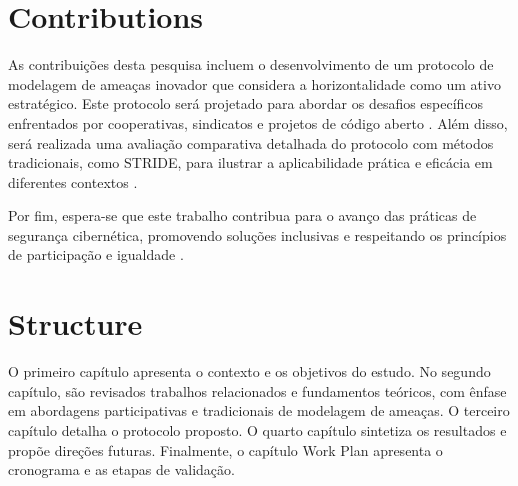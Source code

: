 \section{Contributions}
\label{sec:contributions}

As contribuições desta pesquisa incluem o desenvolvimento de um
protocolo de modelagem de ameaças inovador que considera a
horizontalidade como um ativo estratégico. Este protocolo será
projetado para abordar os desafios específicos enfrentados por
cooperativas, sindicatos e projetos de código aberto
\cite{ThreatModelingASystematicLiteratureReview, CoReTM,
ParticipatoryThreatModelling}. Além disso, será realizada uma
avaliação comparativa detalhada do protocolo com métodos tradicionais,
como STRIDE, para ilustrar a aplicabilidade prática e eficácia em
diferentes contextos \cite{AHybridThreatModelingMethod,
EvaluationofCompetingThreatModeling,
ExperiencesThreatModelingAtMicrosoft,
ThreatModelingASummaryOfAvailableMethods}.

Por fim, espera-se que este trabalho contribua para o avanço das
práticas de segurança cibernética, promovendo soluções inclusivas e
respeitando os princípios de participação e igualdade \cite{Colbac,
AbcCrypto}.

\section{Structure}
\label{sec:structure}

O primeiro capítulo apresenta o contexto e os objetivos do estudo. No
segundo capítulo, são revisados trabalhos relacionados e fundamentos
teóricos, com ênfase em abordagens participativas e tradicionais de
modelagem de ameaças. O terceiro capítulo detalha o protocolo
proposto. O quarto capítulo sintetiza os resultados e propõe direções
futuras. Finalmente, o capítulo Work Plan apresenta o cronograma e as
etapas de validação.
